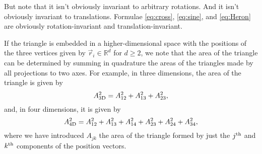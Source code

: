 \documentclass[12pt]{article}
\begin{document}



But note that it isn't obviously invariant to arbitrary rotations.
And it isn't obviously invariant to translations.
Formulae \eqref{eq:cross}, \eqref{eq:sine}, and \eqref{eq:Heron} are obviously rotation-invariant and translation-invariant.

If the triangle is embedded in a higher-dimensional space with the positions of the three vertices given by $\vec{r}_i \in \mathbb{R}^{d}$ for $d \geq 2$, we note that the area of the triangle can be determined by summing in quadrature the areas of the triangles made by all projections to two axes. For example, in three dimensions, the area of the triangle is given by
\begin{equation}
    A_{\rm 3D}^2 =
    A_{12}^2 + A_{13}^2 + A_{23}^2,
\end{equation}
and, in four dimensions, it is given by
\begin{equation}
    A_{\rm 4D}^2 =
    A_{12}^2 + A_{13}^2 + A_{14}^2
    + A_{23}^2 + A_{24}^2
    + A_{34}^2,
\end{equation}
where we have introduced $A_{jk}$ the area of the triangle formed by just the $j^{\rm th}$ and $k^{\rm th}$ components of the position vectors.
\end{document}
